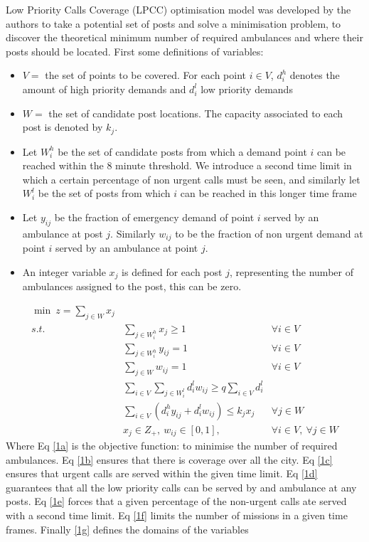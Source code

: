 \documentclass[11pt]{article} %
\begin{document}
Low Priority Calls Coverage (LPCC) optimisation model was developed by the authors to take a potential set of posts and solve a minimisation problem, to discover the theoretical minimum number of required ambulances and where their posts should be located. First some definitions of variables:
\begin{itemize}
	\item $V=$ the set of points to be covered. For each point $ i \in V $, $d_i^h$ denotes the amount of high priority demands and $d_i^l$ low priority demands 
	\item $ W= $ the set of candidate post locations. The capacity associated to each post is denoted by $ k_j $.
	\item Let $ W_i^h $ be the set of candidate posts from which a demand point $ i $ can be reached within the 8 minute threshold. 
	We introduce a second time limit in which a certain percentage of non urgent calls must be seen, and similarly let $ W_i^l $ be the set of posts from which $ i $ can be reached in this longer time frame
	\item Let $ y_{ij} $ be the fraction of emergency demand of point $ i  $ served by an ambulance at post $ j $. Similarly $ w_{ij} $ to be the fraction of non urgent demand at point $ i  $ served by an ambulance at point $ j $.
	\item An integer variable $ x_j $ is defined for each post $ j $, representing the number of ambulances assigned to the post, this can be zero.
\end{itemize}

\begin{eqnarray}
\min \ z=\sum_{j\in W} x_j \label{1a}\\
s.t.\ &\sum_{j\in W_i^h} x_j\geq1\ \ &\forall i \in V\label{1b}\\
&\sum_{j\in W_i^h} y_{ij}=1\ \ &\forall i \in V\label{1c}\\
&\sum_{j\in W}w_{ij}=1 \ \ & \forall i\in V \label{1d}\\
&\sum_{i \in V} \sum_{j \in W_i^l} d_i^l w_{ij} \geq q \sum_{i \in V} d_i^l\label{1e}\\
&\sum_{i \in V} (d_i^h y_{ij} +d_i^l w_{ij}) \leq k_jx_j & \forall j \in W\label{1f}\\
&x_j\in Z_+, \ w_{ij} \in [0,1], \ &\forall i \in V,\  \forall j \in W \label{1g}
\end{eqnarray}
Where Eq \ref{1a} is the objective function: to minimise the number of required ambulances. Eq \ref{1b} ensures that there is coverage over all the city. Eq \ref{1c} ensures that urgent calls are served within the given time limit. Eq \ref{1d} guarantees that all the low priority calls can be served by and ambulance at any posts. Eq \ref{1e} forces that a given percentage of the non-urgent calls ate served with a second time limit. Eq \ref{1f} limits the number of missions in a given time frames. Finally \ref{1g} defines the domains of the variables 
 
\end{document}
